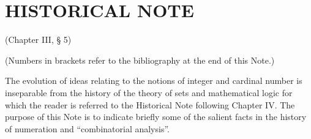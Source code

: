 \clearpage
\section*{HISTORICAL NOTE}
{}

(Chapter III, § 5)

(Numbers in brackets refer to the bibliography at the end of this Note.)

The evolution of ideas relating to the notions of integer and cardinal number is inseparable from the history of the theory of sets and mathematical logic for which the reader is referred to the Historical Note following Chapter IV. The purpose of this Note is to indicate briefly some of the salient facts in the history of numeration and ``combinatorial analysis''.

